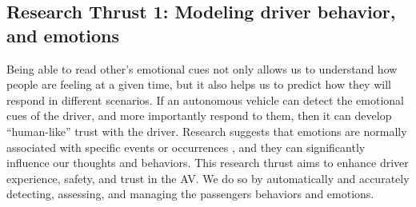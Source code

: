 \subsection{Research Thrust 1: Modeling driver behavior, and emotions}
\label{sec:behaviour}

 Being able to read other’s emotional cues not only allows us to understand how people are feeling at a given time, but it also helps us to predict how they will respond in different scenarios. 
 If an autonomous vehicle can detect the emotional cues of the driver, and more importantly respond to them, then it can develop ``human-like'' trust with the driver.
 Research suggests that emotions are normally associated with specific events or occurrences \cite{cowie2001emotion}, and they can significantly influence our thoughts and behaviors. 
 This research thrust aims to enhance driver experience, safety, and trust in the AV. 
 We do so by automatically and accurately detecting, assessing, and managing the passengers behaviors and emotions. 
 
